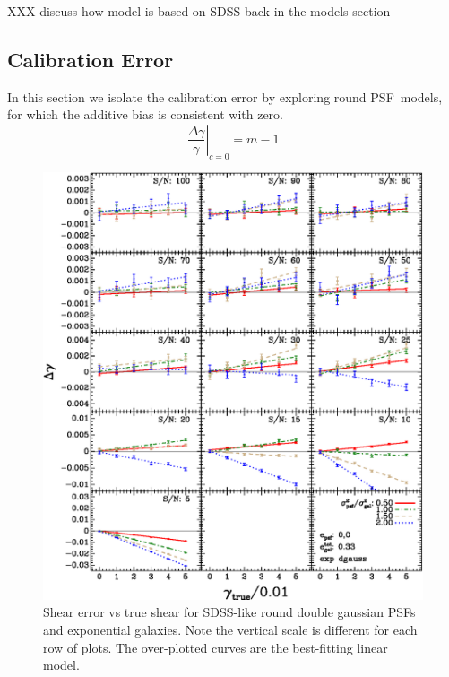 \documentclass[10pt,preprint]{aastex}
\newcommand{\psf}{PSF}
\begin{document}
XXX discuss how model is based on SDSS back in the models section

\subsection{Calibration Error}

In this section we isolate the calibration error by exploring round
\psf\ models, for which the additive bias is consistent with zero.
\begin{equation}
\left. \frac{\Delta \gamma}{\gamma} \right|_{c=0} = m - 1
\end{equation}
\begin{figure}[p] \centering
 \centering 
 \includegraphics[scale=1.1]{figures/set-s2n-edg02-vs-shear.eps}

 \caption{Shear error vs true shear for SDSS-like round double gaussian \psf s
 and exponential galaxies.  Note the vertical scale is different for each row
 of plots.  The over-plotted curves are the best-fitting linear model.}
 \label{fig:edgdiffvsshroundpsf}

\end{figure}
\end{document}

